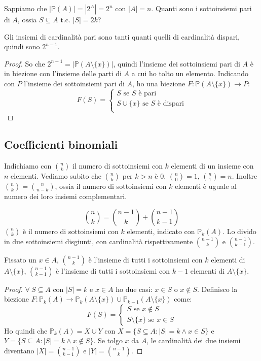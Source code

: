 \begin{prop}
Sappiamo che $|\mathbb{P}(A)| = |2^A| = 2^n$ con $|A| = n$. Quanti sono i sottoinsiemi pari di $A$, ossia $S \subseteq A $ t.c. $|S| = 2k$?

Gli insiemi di cardinalit\`a pari sono tanti quanti quelli di cardinalit\`a dispari, quindi sono $2^{n-1}$.
\end{prop}
\begin{proof}
So che $2^{n-1} = |\mathbb{P}(A \setminus \{x\})|$, quindi l'insieme dei sottoinsiemi pari di $A$ \`e in biezione con l'insieme delle parti di $A$ a cui ho tolto un elemento. Indicando con $P$ l'insieme dei sottoinsiemi pari di $A$, ho una biezione $F : \mathbb{P}(A \setminus \{x\}) \to P$:
\[
F(S) = 
\begin{cases}
S \text{ se } S \text{ \`e pari} \\
S \cup \{ x \} \text{ se } S \text{ \`e dispari} \\
\end{cases}
\]
\end{proof}

\subsection{Coefficienti  binomiali}
Indichiamo con $\binom{n}{k}$ il numero di sottoinsiemi con $k$ elementi di un insieme con $n$ elementi. Vediamo subito che $\binom{n}{k}$ per $k > n$ \`e 0. $\binom{n}{0} = 1$, $\binom{n}{1} = n$. Inoltre $\binom{n}{k} = \binom{n}{n-k}$, ossia il numero di sottoinsiemi con $k$ elementi \`e uguale al numero dei loro insiemi complementari.
\begin{prop}
\[
\binom{n}{k} = \binom{n-1}{k} + \binom{n-1}{k-1}
\]
$\binom{n}{k}$ \`e il numero di sottoinsiemi con $k$ elementi, indicato con $\mathbb{P}_{k}(A)$. Lo divido in due sottoinsiemi disgiunti, con cardinalit\`a rispettivamente $\binom{n-1}{k}$ e $\binom{n-1}{k-1}$.

Fissato un $x \in A$, $\binom{n-1}{k}$ \`e l'insieme di tutti i sottoinsiemi con $k$ elementi di $A \setminus \{ x \}$, $\binom{n-1}{k-1}$ \`e l'insieme di tutti i sottoinsiemi con $k - 1$ elementi di $A \setminus \{x \}$.
\end{prop}
\begin{proof}
$\forall \ S \subseteq A$ con $|S| = k$ e $x \in A$ ho due casi: $x \in S$ o $x \notin S$. Definisco la biezione $F : \mathbb{P}_k (A) \to \mathbb{P}_k (A \setminus \{ x \}) \cup \mathbb{P}_{k - 1} (A \setminus \{ x \})$ come:
\[
F (S) =
\begin{cases}
S \text{ se } x \notin S \\
S \setminus \{ x \} \text{ se } x \in S
\end{cases}
\]
Ho quindi che $\mathbb{P}_k (A) = X \cup Y$ con $X = \{ S \subseteq A : |S| = k \land x \in S \}$ e $Y = \{ S \subseteq A : |S| = k \land x \notin S\}$. Se tolgo $x$ da $A$, le cardinalit\`a dei due insiemi diventano $|X| = \binom{n - 1}{k - 1}$ e $|Y| = \binom{n - 1}{k}$.
\end{proof}

